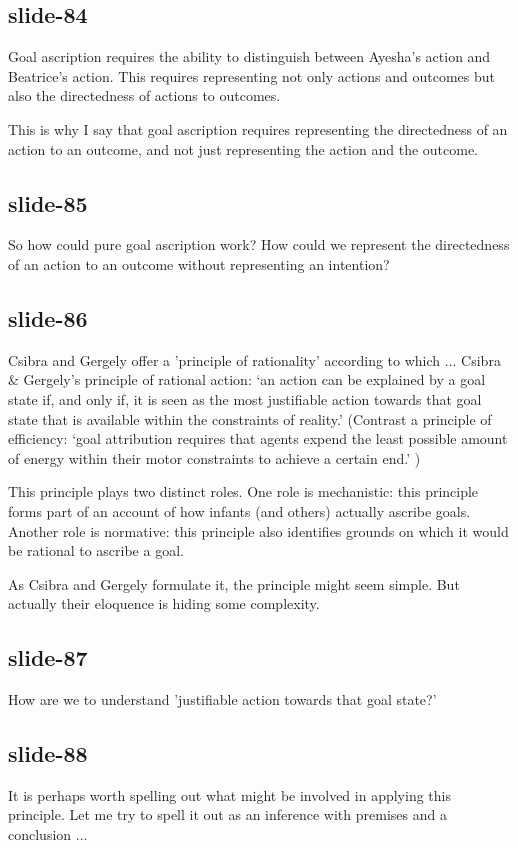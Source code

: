 \documentclass[12pt,\papersize]{extarticle}
\begin{document}
 
\subsection{slide-84}
Goal ascription requires the ability to distinguish between Ayesha's action and Beatrice's action.
This requires representing not only actions and outcomes but also the directedness of actions to outcomes.
 
This is why I say that goal ascription requires representing the directedness of an action to an outcome, and not just representing the action and the outcome.
 
 
\subsection{slide-85}
So how could pure goal ascription work?
How could we represent the directedness of an action to an outcome without representing an intention?
 
 
\subsection{slide-86}
Csibra and Gergely offer a 'principle of rationality' according to which ...
Csibra \& Gergely's principle of rational action: `an action can be explained by a goal state if, and only if, it is seen as the most justifiable action towards that goal state that is available within the constraints of reality.'\citep{Csibra:1998cx,Csibra:2003jv}
(Contrast a principle of efficiency:
`goal attribution requires that agents expend the least possible amount of energy within their motor constraints to achieve a certain end.' \citep%
{Southgate:2008el})
 
This principle plays two distinct roles.
One role is mechanistic: this principle forms part of an account of how infants (and others) actually ascribe goals.
Another role is normative: this principle also identifies grounds on which it would be rational to ascribe a goal.
 
As Csibra and Gergely formulate it, the principle might seem simple.
But actually their eloquence is hiding some complexity.
 
 
\subsection{slide-87}
How are we to understand 'justifiable action towards that goal state?'
 
 
\subsection{slide-88}
It is perhaps worth spelling out what might be involved in applying this principle.
Let me try to spell it out as an inference with premises and a conclusion ...
 
\end{document}
